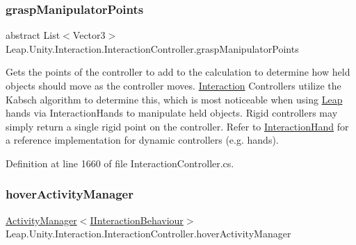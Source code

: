 \mbox{\label{class_leap_1_1_unity_1_1_interaction_1_1_interaction_controller_a6f7f56adcad9f72d65f02e7490403df2}} 
\subsubsection{\texorpdfstring{graspManipulatorPoints}{graspManipulatorPoints}}
{\footnotesize\ttfamily abstract List$<$Vector3$>$ Leap.\+Unity.\+Interaction.\+Interaction\+Controller.\+grasp\+Manipulator\+Points\hspace{0.3cm}{\ttfamily [get]}}



Gets the points of the controller to add to the calculation to determine how held objects should move as the controller moves. \mbox{\hyperlink{namespace_leap_1_1_unity_1_1_interaction}{Interaction}} Controllers utilize the Kabsch algorithm to determine this, which is most noticeable when using \mbox{\hyperlink{namespace_leap_1_1_unity_1_1_leap}{Leap}} hands via Interaction\+Hands to manipulate held objects. Rigid controllers may simply return a single rigid point on the controller. Refer to \mbox{\hyperlink{class_leap_1_1_unity_1_1_interaction_1_1_interaction_hand}{Interaction\+Hand}} for a reference implementation for dynamic controllers (e.\+g. hands). 



Definition at line 1660 of file Interaction\+Controller.\+cs.

\mbox{\label{class_leap_1_1_unity_1_1_interaction_1_1_interaction_controller_a1c4c17da6cee8659687cf864381f1473}} 
\subsubsection{\texorpdfstring{hoverActivityManager}{hoverActivityManager}}
{\footnotesize\ttfamily \mbox{\hyperlink{class_leap_1_1_unity_1_1_interaction_1_1_activity_manager}{Activity\+Manager}}$<$\mbox{\hyperlink{interface_leap_1_1_unity_1_1_interaction_1_1_i_interaction_behaviour}{I\+Interaction\+Behaviour}}$>$ Leap.\+Unity.\+Interaction.\+Interaction\+Controller.\+hover\+Activity\+Manager\hspace{0.3cm}{\ttfamily [get]}}



